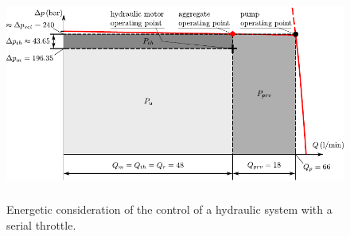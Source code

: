 \begin{figure}[ht!]
	\centering
		\includegraphics[height=7cm]{PositiveDisplacementPumps/Figures/Energy_Efficiency_Serial_Throttle.pdf}
	\caption{Energetic consideration of the control of a hydraulic system with a serial throttle.}
	\label{fig:energy_efficiency_serial_throttle}
\end{figure}

